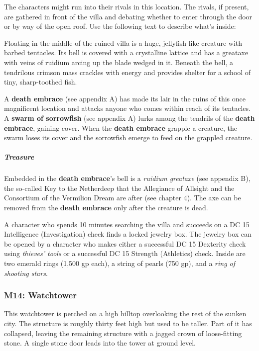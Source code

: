 \documentclass[10pt,a4paper,twoside,bg=print,twocolumn,openany,nodeprecatedcode]{dndbook}
\begin{document}
The characters might run into their rivals in this location. The rivals, if present, are gathered in front of the villa and debating whether to enter through the door or by way of the open roof. Use the following text to describe what's inside:

\begin{DndReadAloud}{}
Floating in the middle of the ruined villa is a huge, jellyfish-like creature with barbed tentacles. Its bell is covered with a crystalline lattice and has a greataxe with veins of ruidium arcing up the blade wedged in it. Beneath the bell, a tendrilous crimson mass crackles with energy and provides shelter for a school of tiny, sharp-toothed fish.

\end{DndReadAloud}

A \textbf{death embrace} (see appendix A) has made its lair in the ruins of this once magnificent location and attacks anyone who comes within reach of its tentacles. A \textbf{swarm of sorrowfish} (see appendix A) lurks among the tendrils of the \textbf{death embrace}, gaining cover. When the \textbf{death embrace} grapple a creature, the swarm loses its cover and the sorrowfish emerge to feed on the grappled creature.

\subparagraph{Treasure}
Embedded in the \textbf{death embrace}'s bell is a \textit{ruidium greataxe} (see appendix B), the so-called Key to the Netherdeep that the Allegiance of Allsight and the Consortium of the Vermilion Dream are after (see chapter 4). The axe can be removed from the \textbf{death embrace} only after the creature is dead.

A character who spends 10 minutes searching the villa and succeeds on a DC 15 Intelligence (Investigation) check finds a locked jewelry box. The jewelry box can be opened by a character who makes either a successful DC 15 Dexterity check using \textit{thieves' tools} or a successful DC 15 Strength (Athletics) check. Inside are two emerald rings (1,500 gp each), a string of pearls (750 gp), and a \textit{ring of shooting stars}.

\subsubsection{M14: Watchtower}
\begin{DndReadAloud}{}
This watchtower is perched on a high hilltop overlooking the rest of the sunken city. The structure is roughly thirty feet high but used to be taller. Part of it has collapsed, leaving the remaining structure with a jagged crown of loose-fitting stone. A single stone door leads into the tower at ground level.

\end{DndReadAloud}
\end{document}
